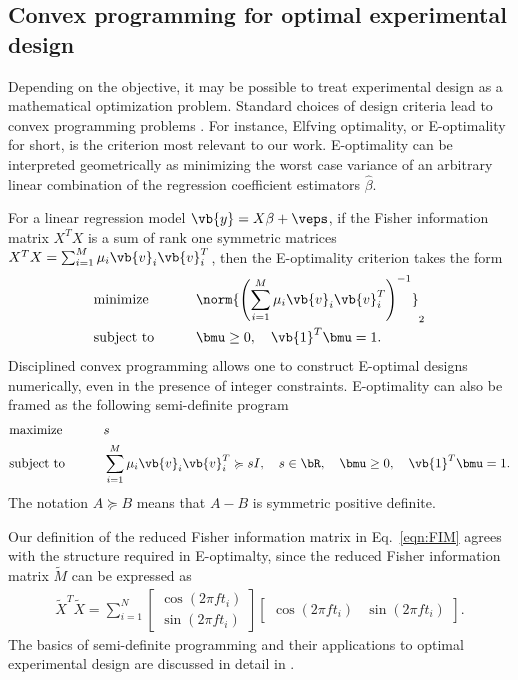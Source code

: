 \subsection{Convex programming for optimal experimental design}\label{sec:oed}
Depending on the objective, it may be possible to treat experimental design as a mathematical optimization problem. Standard choices of design criteria lead to convex programming problems \cite{fedorov1972theory}. For instance, Elfving optimality, or E-optimality for short, is the criterion most relevant to our work. E-optimality can be interpreted geometrically as minimizing the worst case variance of an arbitrary linear combination of the regression coefficient estimators $\hat{\beta}$. 
\begin{defn}[E-optimality]\label{defn:eopt}
    For a linear regression model $\vb{y} = X \beta +\veps$, if the Fisher information matrix $X^T X$ is a sum of rank one symmetric matrices $X^TX = \sum_{i=1}^{M} \mu_{i} \vb{v}_{i} \vb{v}_{i}^T$, then the E-optimality criterion takes the form
    \begin{alignat*}{2}
        &\textrm{minimize}   \quad\quad&&\norm{ \left(\sum_{i=1}^{M} \mu_{i} \vb{v}_{i}\vb{v}_{i}^{T} \right)^{-1} }_2\\
        &\textrm{subject to}  \quad\quad&& \bmu\geq 0,  \quad \vb{1}^T \bmu = 1. 
    \end{alignat*} 
Disciplined convex programming allows one to construct E-optimal designs numerically, even in the presence of integer constraints. E-optimality can also be framed as the following semi-definite program
    \begin{alignat*}{2}
        &\textrm{maximize}   \quad\quad&& s \\
        &\textrm{subject to}  \quad\quad&& \sum_{i=1}^{M} \mu_{i} \vb{v}_{i}\vb{v}_{i}^T \succcurlyeq s I, \quad  s\in \bR, \quad \bmu\geq 0,  \quad \vb{1}^T \bmu = 1.  
    \end{alignat*} 
The notation $A \succcurlyeq B$ means that $A-B$ is symmetric positive definite. 
\end{defn}
Our definition of the reduced Fisher information matrix in Eq.~\eqref{eqn:FIM} agrees with the structure required in E-optimalty, since the reduced Fisher information matrix $\tilde{M}$  can be expressed as
\begin{align}
    \tilde{X}^T \tilde{X} = \sum_{i=1}^{N}   \begin{bmatrix}
        \cos(2\pi f t_i)\\\sin(2\pi f t_i)
    \end{bmatrix}\begin{bmatrix}
        \cos(2\pi f t_i) & \sin(2\pi f t_i)
    \end{bmatrix}.
\end{align}
The basics of semi-definite programming and their applications to optimal experimental design are discussed in detail in \cite{boyd2004convex}. 

